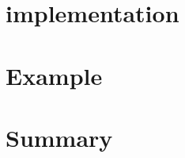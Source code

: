\documentclass[a4paper,nojss]{jss}
\begin{document}
\section[R implementation]{ implementation}
\label{sec:implementation}


\section{Example}
\label{sec:example}


\section{Summary}
\label{sec:summary}



\end{document}
